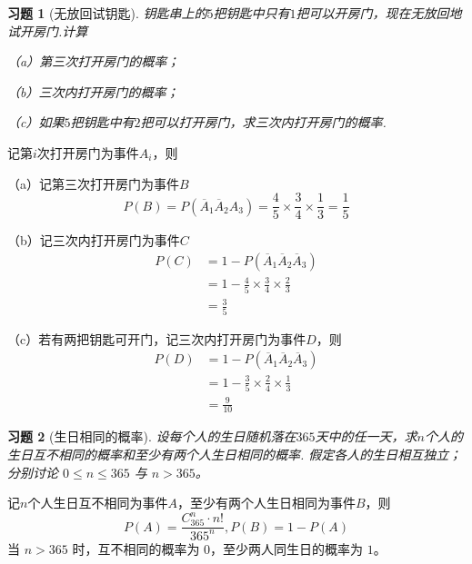 \documentclass[UTF8,12pt,a4paper,fontset=fandol]{ctexart}
\newtheorem{exercise}{习题}[section]
\begin{document}
\begin{exercise}[无放回试钥匙]\label{q:Y1.7}
钥匙串上的$5$把钥匙中只有$1$把可以开房门，现在无放回地试开房门.计算

（a）第三次打开房门的概率；

（b）三次内打开房门的概率；

（c）如果$5$把钥匙中有$2$把可以打开房门，求三次内打开房门的概率.\par{}
\end{exercise}

\begin{solve}\label{a:Y1.7}
记第$i$次打开房门为事件$A_i$，则

（a）记第三次打开房门为事件$B$
\[P(B)=P({\overline A _1}{\overline A _2}{A_3}) = \frac{4}{5} \times \frac{3}{4} \times \frac{1}{3} = \frac{1}{5}\]

（b）记三次内打开房门为事件$C$
\[\begin{aligned}P(C) &= 1 - P({\overline A _1}{\overline A _2}{\overline A _3}) \\&= 1 - \frac{4}{5} \times \frac{3}{4} \times \frac{2}{3} \\&= \frac{3}{5}\end{aligned}\]

（c）若有两把钥匙可开门，记三次内打开房门为事件$D$，则
\[\begin{aligned}P(D) &= 1 - P({\overline A _1}{\overline A _2}{\overline A _3}) \\&= 1 - \frac{3}{5} \times \frac{2}{4} \times \frac{1}{3} \\&= \frac{9}{{10}}\end{aligned}\]
\end{solve}

\begin{exercise}[生日相同的概率]\label{q:Y1.8}
设每个人的生日随机落在$365$天中的任一天，求$n$个人的生日互不相同的概率和至少有两个人生日相同的概率. 假定各人的生日相互独立；分别讨论 $0\le n\le365$ 与 $n>365$。\par{}
\end{exercise}

\begin{solve}\label{a:Y1.8}
记$n$个人生日互不相同为事件$A$，至少有两个人生日相同为事件$B$，则
\[P(A) = \frac{{C_{365}^n}\cdot n!}{{{{365}^n}}},P(B) = 1 - P(A)\]
 当 $n>365$ 时，互不相同的概率为 $0$，至少两人同生日的概率为 $1$。\end{solve}
\end{document}
